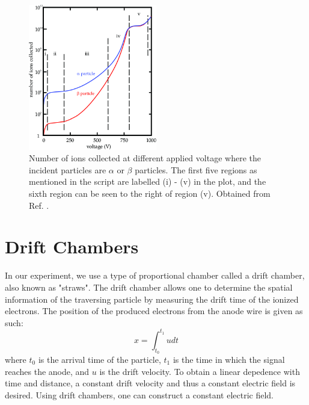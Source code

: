 \documentclass[a4paper]{report}
\numberwithin{equation}{section}
\begin{document}
\begin{figure}[!h]
	\centering
	\includegraphics[width=0.5\textwidth]{ionization_regions.png}
	\caption{Number of ions collected at different applied voltage where the incident particles are $\alpha$ or $\beta$ particles. 
	The first five regions as mentioned in the script are labelled (i) - (v) in the plot, and the sixth region can be seen to the right of region (v). 
	Obtained from Ref. \cite{Lukas2018}. }
	\label{fig:ionization_regions}	
\end{figure}

\section{Drift Chambers}

In our experiment, we use a type of proportional chamber called a drift chamber, also known as "straws". The drift chamber allows one to determine the spatial information 
of the traversing particle by measuring the drift time of the ionized electrons. The position of the produced electrons from the anode wire is 
given as such: 
\begin{equation}
	x = \int_{t_0}^{t_1} u dt
\end{equation}
where $t_0$ is the arrival time of the particle, $t_1$ is the time in which the signal reaches the anode, and $u$ is the drift velocity. To obtain a 
linear depedence with time and distance, a constant drift velocity and thus a constant electric field is desired. Using drift chambers, one can 
construct a constant electric field. \par 
\end{document}
